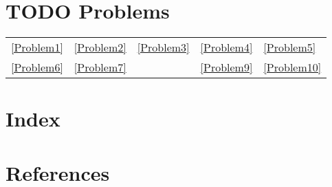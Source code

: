 \documentclass[11pt]{article}
\begin{document}
\section{{\bfseries\sffamily TODO} Problems}
\label{sec:orgc059f0b}
\begin{center}
\begin{tabular}{lllll}
\ref{Problem1} & \ref{Problem2} & \ref{Problem3} & \ref{Problem4} & \ref{Problem5}\\
\ref{Problem6} & \ref{Problem7} &  & \ref{Problem9} & \ref{Problem10}\\
\end{tabular}
\end{center}

\section{Index}
\label{sec:org5036cad}

\renewcommand{\indexname}{}
\printindex

\section{References}
\label{sec:org8094505}

\label{bibliographystyle link}


\label{bibliography link}

\end{document}
